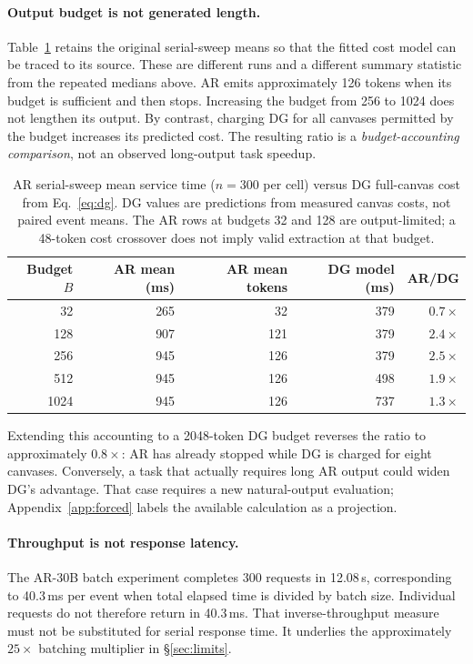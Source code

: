 \paragraph{Output budget is not generated length.}
Table~\ref{tab:niche} retains the original serial-sweep means so that
the fitted cost model can be traced to its source. These are different
runs and a different summary statistic from the repeated medians above.
AR emits approximately 126 tokens when its budget is sufficient and
then stops. Increasing the budget from 256 to 1024 does not lengthen
its output. By contrast, charging DG for all canvases permitted by the
budget increases its predicted cost. The resulting ratio is a
\emph{budget-accounting comparison}, not an observed long-output task
speedup.

\begin{table}[ht]
\centering
\caption{AR serial-sweep mean service time ($n{=}300$ per cell) versus
DG full-canvas cost from Eq.~\ref{eq:dg}. DG values are predictions
from measured canvas costs, not paired event means. The AR rows at
budgets 32 and 128 are output-limited; a 48-token cost crossover does
not imply valid extraction at that budget.}
\label{tab:niche}
\begin{tabular}{@{}rrrrr@{}}
\toprule
Budget $B$ & AR mean (ms) & AR mean tokens & DG model (ms) & AR/DG \\
\midrule
32 & 265 & 32 & 379 & $0.7\times$ \\
128 & 907 & 121 & 379 & $2.4\times$ \\
256 & 945 & 126 & 379 & $2.5\times$ \\
512 & 945 & 126 & 498 & $1.9\times$ \\
1024 & 945 & 126 & 737 & $1.3\times$ \\
\bottomrule
\end{tabular}
\end{table}

Extending this accounting to a 2048-token DG budget reverses the
ratio to approximately $0.8\times$: AR has already stopped while DG
is charged for eight canvases. Conversely, a task that actually requires
long AR output could widen DG's advantage. That case requires a new
natural-output evaluation; Appendix~\ref{app:forced} labels the
available calculation as a projection.

\paragraph{Throughput is not response latency.}
The AR-30B batch experiment completes 300 requests in 12.08\,s,
corresponding to 40.3\,ms per event when total elapsed time is divided
by batch size. Individual requests do not therefore return in 40.3\,ms.
That inverse-throughput measure must not be substituted for serial
response time. It underlies the approximately $25\times$ batching
multiplier in \S\ref{sec:limits}.

